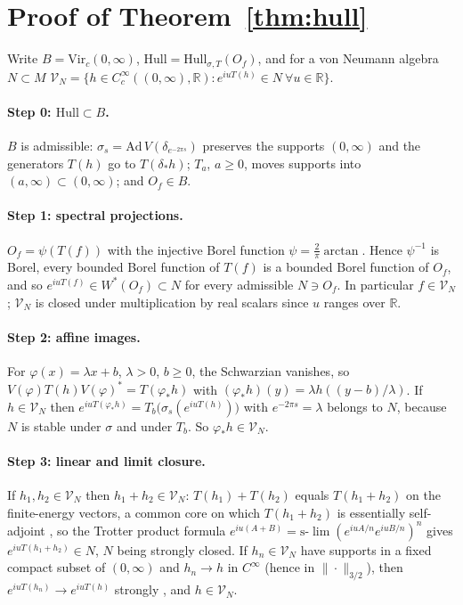 \documentclass[12pt]{article}
\theoremstyle{definition}
\theoremstyle{remark}
\begin{document}
\appendix

\section{Proof of Theorem~\ref{thm:hull}}\label{app:hull}

Write \(B=\mathrm{Vir}_c(0,\infty)\), \(\mathrm{Hull}=\mathrm{Hull}_{\sigma,T}(O_f)\), and for a
von Neumann algebra \(N\subset M\)
\(\mathcal V_N=\{h\in C_c^\infty((0,\infty),\mathbb R):e^{iuT(h)}\in N\ \forall u\in\mathbb R\}\).

\paragraph{Step 0: \(\mathrm{Hull}\subset B\).} \(B\) is admissible: \(\sigma_s=\mathrm{Ad}\,V(\delta_{e^{-2\pi s}})\) preserves
the supports \((0,\infty)\) and the generators \(T(h)\) go to \(T(\delta_*h)\); \(T_a\), \(a\ge0\),
moves supports into \((a,\infty)\subset(0,\infty)\); and \(O_f\in B\).

\paragraph{Step 1: spectral projections.} \(O_f=\psi(T(f))\) with the injective Borel function
\(\psi=\tfrac2\pi\arctan\). Hence \(\psi^{-1}\) is Borel, every bounded Borel function of
\(T(f)\) is a bounded Borel function of \(O_f\), and so \(e^{iuT(f)}\in W^*(O_f)\subset N\)
for every admissible \(N\ni O_f\). In particular \(f\in\mathcal V_N\); \(\mathcal V_N\) is
closed under multiplication by real scalars since \(u\) ranges over \(\mathbb R\).

\paragraph{Step 2: affine images.} For \(\varphi(x)=\lambda x+b\), \(\lambda>0\), \(b\ge0\), the Schwarzian
vanishes, so \(V(\varphi)T(h)V(\varphi)^*=T(\varphi_*h)\) with
\((\varphi_*h)(y)=\lambda h((y-b)/\lambda)\). If \(h\in\mathcal V_N\) then
\(e^{iuT(\varphi_*h)}=T_b\big(\sigma_s(e^{iuT(h)})\big)\) with \(e^{-2\pi s}=\lambda\)
belongs to \(N\), because \(N\) is stable under \(\sigma\) and under \(T_b\). So
\(\varphi_*h\in\mathcal V_N\).

\paragraph{Step 3: linear and limit closure.} If \(h_1,h_2\in\mathcal V_N\) then
\(h_1+h_2\in\mathcal V_N\): \(T(h_1)+T(h_2)\) equals \(T(h_1+h_2)\) on the finite-energy
vectors, a common core on which \(T(h_1+h_2)\) is essentially self-adjoint
\cite[Thm.~4.4]{CW}, so the Trotter product formula
\(e^{iu(A+B)}=\text{s-}\lim(e^{iuA/n}e^{iuB/n})^n\) gives
\(e^{iuT(h_1+h_2)}\in N\), \(N\) being strongly closed. If \(h_n\in\mathcal V_N\) have
supports in a fixed compact subset of \((0,\infty)\) and \(h_n\to h\) in \(C^\infty\)
(hence in \(\|\cdot\|_{3/2}\)), then \(e^{iuT(h_n)}\to e^{iuT(h)}\) strongly
\cite[Prop.~4.5]{CW}, and \(h\in\mathcal V_N\).
\end{document}
